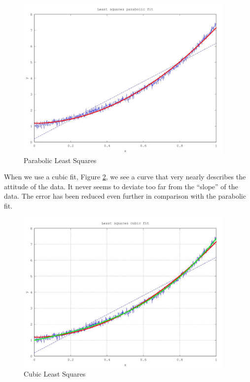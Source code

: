 \documentclass[12pt,letterpaper]{article}
\begin{document}
\begin{enumerate}
      \begin{figure}[h]
        \centering
        \includegraphics[width=0.95\textwidth]{least_squares_parabolic.jpg}
        \caption{Parabolic Least Squares}
        \label{fig:parabolic_least_squares}
      \end{figure}

      \pagebreak

      When we use a cubic fit, Figure \ref{fig:cubic_least_squares}, we see a curve that very nearly describes the attitude of the data. It never seems to deviate too far from the ``slope'' of the data. The error has been reduced even further in comparison with the parabolic fit.

      \begin{figure}[h]
        \centering
        \includegraphics[width=0.95\textwidth]{least_squares_cubic.jpg}
        \caption{Cubic Least Squares}
        \label{fig:cubic_least_squares}
      \end{figure}


\end{enumerate}
\end{document}
